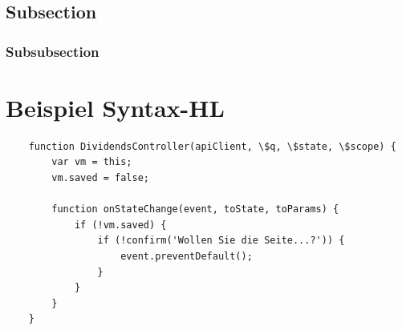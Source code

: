 \documentclass[chapterprefix=false, 12pt, a4paper, oneside, parskip=half, listof=totoc, bibliography=totoc, numbers=noendperiod]{scrbook}
\begin{document}
	\subsection{Subsection}
	\subsubsection{Subsubsection}

    \section{Beispiel Syntax-HL}
    \begin{verbatim}
    function DividendsController(apiClient, \$q, \$state, \$scope) {
        var vm = this;
        vm.saved = false;

        function onStateChange(event, toState, toParams) {
            if (!vm.saved) {
                if (!confirm('Wollen Sie die Seite...?')) {
                    event.preventDefault();
                }
            }
        }
    }
    \end{verbatim}




\end{document}
